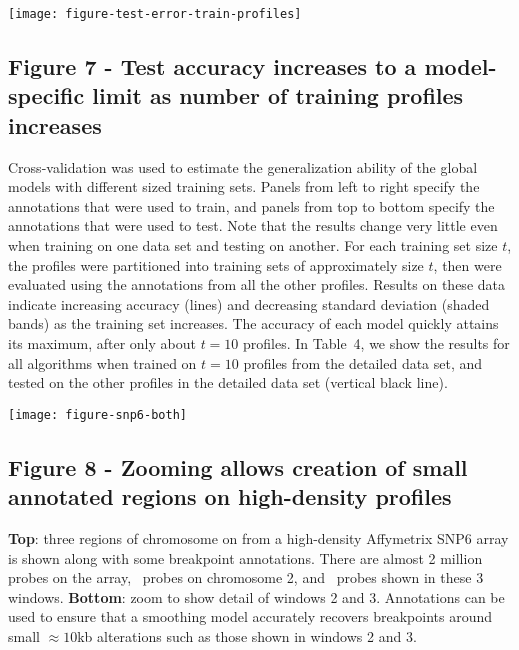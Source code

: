 \documentclass[10pt]{bmc_article}
\newenvironment{bmcformat}{\begin{raggedright}\baselineskip20pt\sloppy\setboolean{publ}{false}}{\end{raggedright}\baselineskip20pt\sloppy}
\begin{document}
\begin{bmcformat}
\newpage



\texttt{[image: figure-test-error-train-profiles]}


\subsection*{Figure 7 - Test accuracy increases to a model-specific
  limit as number of training profiles increases}
Cross-validation was used to estimate the generalization ability of
the global models with different sized training sets. Panels from left
to right specify the annotations that were used to train, and panels
from top to bottom specify the annotations that were used to
test. Note that the results change very little even when training on
one data set and testing on another. For each training set size $t$,
the profiles were partitioned into training sets of approximately size
$t$, then were evaluated using the annotations from all the other
profiles. Results on these data indicate increasing accuracy (lines)
and decreasing standard deviation (shaded bands) as the training set
increases. The accuracy of each model quickly attains its maximum,
after only about $t=10$ profiles. In Table~4, we show the results for
all algorithms when trained on $t=10$ profiles from the detailed data
set, and tested on the other profiles in the detailed data set
(vertical black line).

\newpage

\texttt{[image: figure-snp6-both]}

\subsection*{Figure 8 - Zooming allows creation of small annotated
  regions on high-density profiles}

\textbf{Top}: three regions of chromosome on from a high-density
Affymetrix SNP6 array is shown along with some breakpoint
annotations. There are almost 2 million probes on the array,
\unskip\ probes on chromosome 2, and
\unskip\ probes shown in these 3
windows. \textbf{Bottom}: zoom to show detail of windows 2 and
3. Annotations can be used to ensure that a smoothing model accurately
recovers breakpoints around small $\approx 10$kb alterations such as
those shown in windows 2 and 3.


\end{bmcformat}
\end{document}
